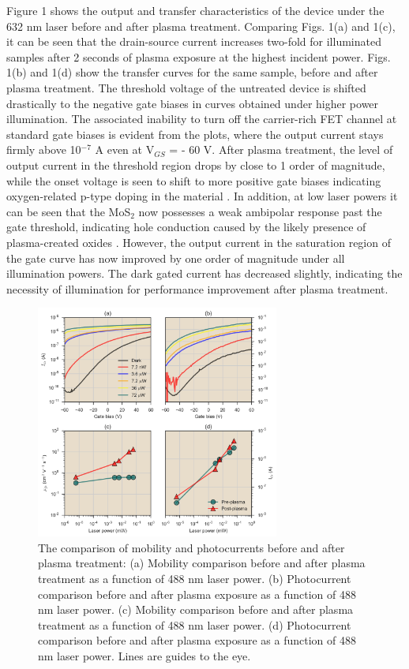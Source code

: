 \documentclass[%
 reprint,
superscriptaddress,
 amsmath,amssymb,
 aps,
prb,
]{revtex4-1}
\begin{document}
\indent Figure 1 shows the output and transfer characteristics of the device under the 632 nm laser before and after plasma treatment. Comparing Figs. 1(a) and 1(c), it can be seen that the drain-source current increases two-fold for illuminated samples after 2 seconds of plasma exposure at the highest incident power. Figs. 1(b) and 1(d) show the transfer curves for the same sample, before and after plasma treatment. The threshold voltage of the untreated device is shifted drastically to the negative gate biases in curves obtained under higher power illumination. The associated inability to turn off the carrier-rich FET channel at standard gate biases is evident from the plots, where the output current stays firmly above 10$^{-7}$ A even at V$_{GS}$ =  - 60 V. After plasma treatment, the level of output current in the threshold region drops by close to 1 order of magnitude, while the onset voltage is seen to shift to more positive gate biases indicating oxygen-related p-type doping in the material \cite{giannazzo2017ambipolar,guo2017observation}. In addition, at low laser powers it can be seen that the MoS$_2$ now possesses a weak ambipolar response past the gate threshold, indicating hole conduction caused by the likely presence of plasma-created oxides \cite{chuang2014mos2, mcdonnell2014hole}. However, the output current in the saturation region of the gate curve has now improved by one order of magnitude under all illumination powers. The dark gated current has decreased slightly, indicating the necessity of illumination for performance improvement after plasma treatment.
\begin{center}
\begin{figure}[!htb]
\includegraphics[width=80mm]{Fig_2.png}
\caption{The comparison of mobility and photocurrents before and after plasma treatment: (a) Mobility comparison before and after plasma treatment as a function of 488 nm laser power. (b) Photocurrent comparison before and after plasma exposure as a function of 488 nm laser power. (c) Mobility comparison before and after plasma treatment as a function of 488 nm laser power. (d) Photocurrent comparison before and after plasma exposure as a function of 488 nm laser power. Lines are guides to the eye.}
\end{figure}
\end{center}
\end{document}
